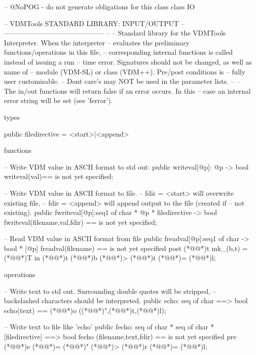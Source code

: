 \documentclass[a4paper]{article}
\begin{document}
\title{}
\author{}
\begin{vdm_al}
-- @NoPOG - do not generate obligations for this class
class IO

--  VDMTools STANDARD LIBRARY: INPUT/OUTPUT
--      --------------------------------------------
-- 
-- Standard library for the VDMTools Interpreter. When the interpreter
-- evaluates the preliminary functions/operations in this file,
-- corresponding internal functions is called instead of issuing a run
-- time error. Signatures should not be changed, as well as name of
-- module (VDM-SL) or class (VDM++). Pre/post conditions is 
-- fully user customisable. 
-- Dont care's may NOT be used in the parameter lists.
--
-- The in/out functions  will return false if an error occurs. In this
-- case an internal error string will be set (see 'ferror').

types
 
public
filedirective = <start>|<append> 

functions

-- Write VDM value in ASCII format to std out:
public
writeval[@p]: @p -> bool
writeval(val)==
  is not yet specified;

-- Write VDM value in ASCII format to file.
-- fdir = <start> will overwrite existing file,
-- fdir = <append> will append output to the file (created if
-- not existing).
public
fwriteval[@p]:seq1 of char * @p * filedirective -> bool
fwriteval(filename,val,fdir) ==
  is not yet specified;

-- Read VDM value in ASCII format from file
public
freadval[@p]:seq1 of char -> bool * [@p]
freadval(filename) ==
  is not yet specified
  post (*@@*)t mk_(b,t) = (*@@*)T in (*@@*)t (*@\vdmnotcovered{}@*)b (*@\vdmnotcovered{=}@*)> (*@\vdmnotcovered{}@*)t (*@\vdmnotcovered{}@*)= (*@@*)l;

operations

-- Write text to std out. Surrounding double quotes will be stripped,
-- backslashed characters should be interpreted.
public
echo: seq of char ==> bool
echo(text) ==
  (*@@*)o ((*@@*)",(*@@*)t,(*@@*)l);

-- Write text to file like 'echo'
public
fecho: seq of char * seq of char * [filedirective] ==> bool
fecho (filename,text,fdir) ==
  is not yet specified
  pre (*@@*)e (*@\vdmnotcovered{}@*)= (*@@*)" (*@\vdmnotcovered{<=}@*)> (*@@*)r (*@\vdmnotcovered{}@*)= (*@@*)l;


\end{vdm_al}
\end{document}
